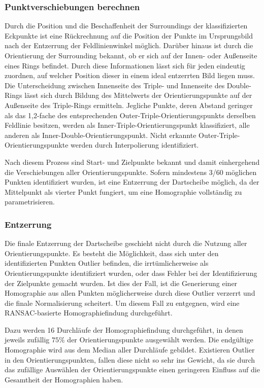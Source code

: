 \subsubsection{Punktverschiebungen berechnen}
\label{sec:punktverschiebungen}

Durch die Position und die Beschaffenheit der Surroundings der klassifizierten Eckpunkte ist eine Rückrechnung auf die Position der Punkte im Ursprungsbild nach der Entzerrung der Feldlinienwinkel möglich. Darüber hinaus ist durch die Orientierung der Surrounding bekannt, ob er sich auf der Innen- oder Außenseite eines Rings befindet. Durch diese Informationen lässt sich für jeden eindeutig zuordnen, auf welcher Position dieser in einem ideal entzerrten Bild liegen muss. Die Unterscheidung zwischen Innenseite des Triple- und Innenseite des Double-Rings lässt sich durch Bildung des Mittelwerts der Orientierungspunkte auf der Außenseite des Triple-Rings ermitteln. Jegliche Punkte, deren Abstand geringer als das 1,2-fache des entsprechenden Outer-Triple-Orientierungspunkts derselben Feldlinie besitzen, werden als Inner-Triple-Orientierungspunkt klassifiziert, alle anderen als Inner-Double-Orientierungspunkt. Nicht erkannte Outer-Triple-Orientierungspunkte werden durch Interpolierung identifiziert.

Nach diesem Prozess sind Start- und Zielpunkte bekannt und damit einhergehend die Verschiebungen aller Orientierungspunkte. Sofern mindestens 3/60 möglichen Punkten identifiziert wurden, ist eine Entzerrung der Dartscheibe möglich, da der Mittelpunkt als vierter Punkt fungiert, um eine Homographie vollständig zu parametrisieren.

\subsubsection{Entzerrung}
\label{sec:entzerrung}

Die finale Entzerrung der Dartscheibe geschieht nicht durch die Nutzung aller Orientierungspunkte. Es besteht die Möglichkeit, dass sich unter den identifizierten Punkten Outlier befinden, die irrtümlicherweise als Orientierungspunkte identifiziert wurden, oder dass Fehler bei der Identifizierung der Zielpunkte gemacht wurden. Ist dies der Fall, ist die Generierung einer Homographie aus allen Punkten möglicherweise durch diese Outlier verzerrt und die finale Normalisierung scheitert. Um diesem Fall zu entgegnen, wird eine RANSAC-basierte Homographiefindung durchgeführt.

Dazu werden 16 Durchläufe der Homographiefindung durchgeführt, in denen jeweils zufällig $75\%$ der Orientierungspunkte ausgewählt werden. Die endgültige Homographie wird aus dem Median aller Durchläufe gebildet. Existieren Outlier in den Orientierungspunkten, fallen diese nicht so sehr ins Gewicht, da sie durch das zufällige Auswählen der Orientierungspunkte einen geringeren Einfluss auf die Gesamtheit der Homographien haben.

